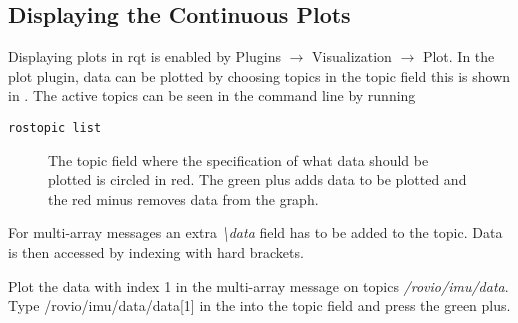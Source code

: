 \subsection{Displaying the Continuous Plots}
Displaying plots in rqt is enabled by Plugins $\rightarrow$ Visualization $\rightarrow$ Plot. In the plot plugin, data can be plotted by choosing topics in the topic field this is shown in . The active topics can be seen in the command line by running 
\begin{lstlisting}
rostopic list
\end{lstlisting}
\begin{figure}
\centering
{}
\caption{The topic field where the specification of what data should be plotted is circled in red. The green plus adds data to be plotted and the red minus removes data from the graph.}
\label{fig:contplot}
\end{figure}

For multi-array messages an extra \textit{\textbackslash data} field has to be added to the topic. Data is then accessed by indexing with hard brackets. 
\begin{example}
Plot the data with index 1 in the multi-array message on topics \textit{/rovio/imu/data}. Type /rovio/imu/data/data[1] in the into the topic field and press the green plus.  
\end{example}


